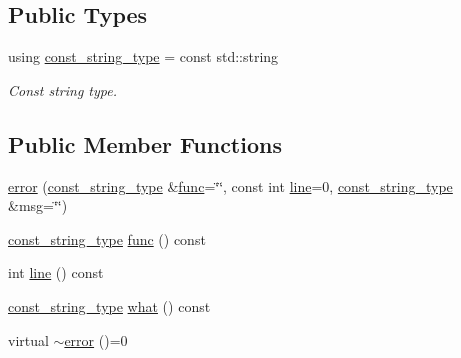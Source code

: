 \subsection*{Public Types}
\begin{DoxyCompactItemize}
\item 
\mbox{\label{classatom_1_1error_ac330e9fb7cedcf4a173c5eb156d7bdaf}} 
using \hyperlink{classatom_1_1error_ac330e9fb7cedcf4a173c5eb156d7bdaf}{const\+\_\+string\+\_\+type} = const std\+::string
\begin{DoxyCompactList}\small\item\em Const string type. \end{DoxyCompactList}\end{DoxyCompactItemize}
\subsection*{Public Member Functions}
\begin{DoxyCompactItemize}
\item 
\hyperlink{classatom_1_1error_aef6fb75c74af10599648f701cf8b0844}{error} (\hyperlink{classatom_1_1error_ac330e9fb7cedcf4a173c5eb156d7bdaf}{const\+\_\+string\+\_\+type} \&\hyperlink{classatom_1_1error_a0a70a92b1638bfe4be7972651ae0c5c8}{func}=\char`\"{}\char`\"{}, const int \hyperlink{classatom_1_1error_aa9443d1a458d0dc6086372444a58e8c6}{line}=0, \hyperlink{classatom_1_1error_ac330e9fb7cedcf4a173c5eb156d7bdaf}{const\+\_\+string\+\_\+type} \&msg=\char`\"{}\char`\"{})
\item 
\hyperlink{classatom_1_1error_ac330e9fb7cedcf4a173c5eb156d7bdaf}{const\+\_\+string\+\_\+type} \hyperlink{classatom_1_1error_a0a70a92b1638bfe4be7972651ae0c5c8}{func} () const
\item 
int \hyperlink{classatom_1_1error_aa9443d1a458d0dc6086372444a58e8c6}{line} () const
\item 
\hyperlink{classatom_1_1error_ac330e9fb7cedcf4a173c5eb156d7bdaf}{const\+\_\+string\+\_\+type} \hyperlink{classatom_1_1error_a126f6c573e37febac3148244389f7736}{what} () const
\item 
virtual \hyperlink{classatom_1_1error_a89bbb11a0ab57de79697ad10e64a77fb}{$\sim$error} ()=0
\end{DoxyCompactItemize}
